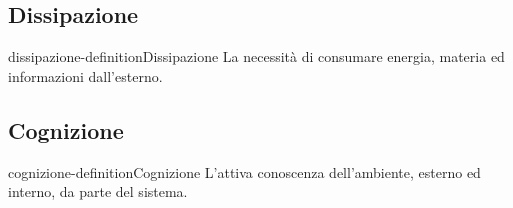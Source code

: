 \documentclass[preview]{standalone}
\begin{document}
\subsection{Dissipazione}

\begin{snippetdefinition}{dissipazione-definition}{Dissipazione}
    La necessità di consumare energia, materia ed informazioni dall'esterno.
\end{snippetdefinition}


\subsection{Cognizione}

\begin{snippetdefinition}{cognizione-definition}{Cognizione}
    L'attiva conoscenza dell'ambiente, esterno ed interno, da parte del sistema.
\end{snippetdefinition}
\end{document}
